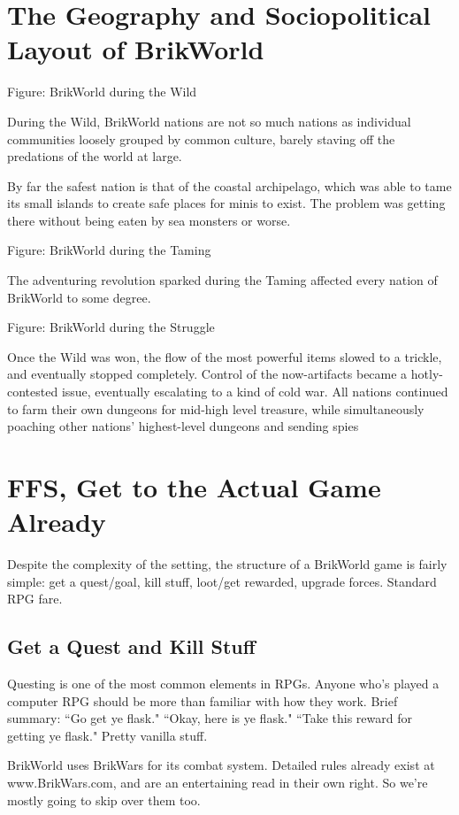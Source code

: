 \documentclass[12pt,a4paper,twocolumn]{article}
\begin{document}
\section{The Geography and Sociopolitical Layout of BrikWorld}

Figure: BrikWorld during the Wild

During the Wild, BrikWorld nations are not so much nations as individual communities loosely grouped by common culture, barely staving off the predations of the world at large.  

By far the safest nation is that of the coastal archipelago, which was able to tame its small islands to create safe places for minis to exist.  The problem was getting there without being eaten by sea monsters or worse.

Figure: BrikWorld during the Taming

The adventuring revolution sparked during the Taming affected every nation of BrikWorld to some degree.

Figure: BrikWorld during the Struggle

Once the Wild was won, the flow of the most powerful items slowed to a trickle, and eventually stopped completely.  Control of the now-artifacts became a hotly-contested issue, eventually escalating to a kind of cold war.  All nations continued to farm their own dungeons for mid-high level treasure, while simultaneously poaching other nations' highest-level dungeons and sending spies 

\section{FFS, Get to the Actual Game Already}

Despite the complexity of the setting, the structure of a BrikWorld game is fairly simple: get a quest/goal, kill stuff, loot/get rewarded, upgrade forces.  Standard RPG fare.

\subsection{Get a Quest and Kill Stuff}

Questing is one of the most common elements in RPGs. Anyone who's played a computer RPG should be more than familiar with how they work.  Brief summary: ``Go get ye flask." ``Okay, here is ye flask." ``Take this reward for getting ye flask."  Pretty vanilla stuff.  

BrikWorld uses BrikWars for its combat system.  Detailed rules already exist at www.BrikWars.com, and are an entertaining read in their own right.  So we're mostly going to skip over them too.  
\end{document}
